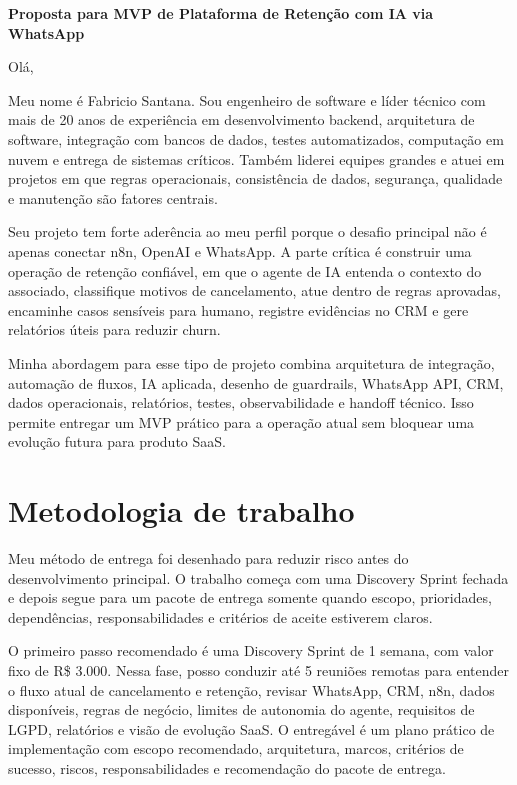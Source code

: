 \documentclass[11pt,a4paper]{article}
\begin{document}
\begin{center}
{\LARGE\bfseries Proposta para MVP de Plataforma de Retenção com IA via WhatsApp}
\end{center}
\vspace{0.5em}

Olá,\par

Meu nome é Fabricio Santana. Sou engenheiro de software e líder técnico com mais de 20 anos de experiência em desenvolvimento backend, arquitetura de software, integração com bancos de dados, testes automatizados, computação em nuvem e entrega de sistemas críticos. Também liderei equipes grandes e atuei em projetos em que regras operacionais, consistência de dados, segurança, qualidade e manutenção são fatores centrais.\par

Seu projeto tem forte aderência ao meu perfil porque o desafio principal não é apenas conectar n8n, OpenAI e WhatsApp. A parte crítica é construir uma operação de retenção confiável, em que o agente de IA entenda o contexto do associado, classifique motivos de cancelamento, atue dentro de regras aprovadas, encaminhe casos sensíveis para humano, registre evidências no CRM e gere relatórios úteis para reduzir churn.\par

Minha abordagem para esse tipo de projeto combina arquitetura de integração, automação de fluxos, IA aplicada, desenho de guardrails, WhatsApp API, CRM, dados operacionais, relatórios, testes, observabilidade e handoff técnico. Isso permite entregar um MVP prático para a operação atual sem bloquear uma evolução futura para produto SaaS.\par

\section*{Metodologia de trabalho}

Meu método de entrega foi desenhado para reduzir risco antes do desenvolvimento principal. O trabalho começa com uma Discovery Sprint fechada e depois segue para um pacote de entrega somente quando escopo, prioridades, dependências, responsabilidades e critérios de aceite estiverem claros.\par

O primeiro passo recomendado é uma Discovery Sprint de 1 semana, com valor fixo de R\$ 3.000. Nessa fase, posso conduzir até 5 reuniões remotas para entender o fluxo atual de cancelamento e retenção, revisar WhatsApp, CRM, n8n, dados disponíveis, regras de negócio, limites de autonomia do agente, requisitos de LGPD, relatórios e visão de evolução SaaS. O entregável é um plano prático de implementação com escopo recomendado, arquitetura, marcos, critérios de sucesso, riscos, responsabilidades e recomendação do pacote de entrega.\par
\end{document}
